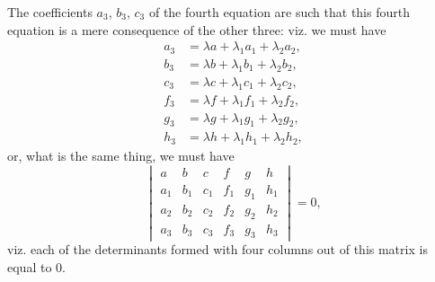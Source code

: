 \documentclass[11pt,a4paper]{article}
\theoremstyle{plain}
\theoremstyle{definition}
\theoremstyle{remark}
\begin{document}
The coefficients $a_3$, $b_3$, $c_3$ of the fourth equation are such that this fourth equation is a mere consequence of the other three: viz. we must have
\begin{align*}
a_3 &= \lambda a + \lambda_1 a_1 + \lambda_2 a_2,\\
b_3 &= \lambda b + \lambda_1 b_1 + \lambda_2 b_2,\\
c_3 &= \lambda c + \lambda_1 c_1 + \lambda_2 c_2,\\
f_3 &= \lambda f + \lambda_1 f_1 + \lambda_2 f_2,\\
g_3 &= \lambda g + \lambda_1 g_1 + \lambda_2 g_2,\\
h_3 &= \lambda h + \lambda_1 h_1 + \lambda_2 h_2,
\end{align*}
or, what is the same thing, we must have
\[
\begin{vmatrix}
a & b & c & f & g & h \\
a_1 & b_1 & c_1 & f_1 & g_1 & h_1 \\
a_2 & b_2 & c_2 & f_2 & g_2 & h_2 \\
a_3 & b_3 & c_3 & f_3 & g_3 & h_3
\end{vmatrix} = 0,
\]
viz. each of the determinants formed with four columns out of this matrix is equal to 0.
\end{document}
